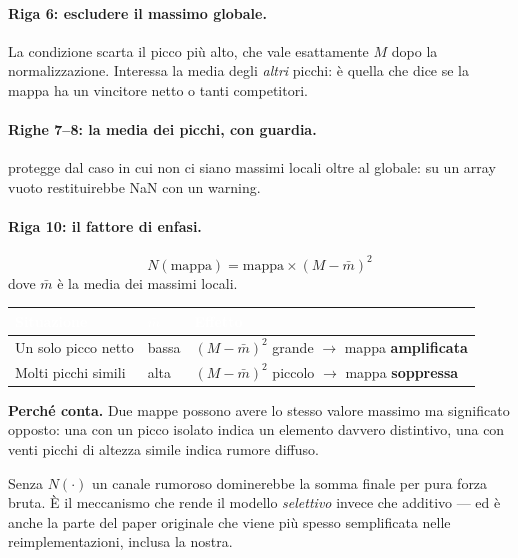 \paragraph{Riga 6: escludere il massimo globale.}
La condizione  scarta il picco più alto, che vale esattamente $M$
dopo la normalizzazione. Interessa la media degli \emph{altri} picchi: è quella che dice se la
mappa ha un vincitore netto o tanti competitori.

\paragraph{Righe 7--8: la media dei picchi, con guardia.}
 protegge dal caso in cui non ci siano massimi locali oltre al globale:
 su un array vuoto restituirebbe NaN con un warning.

\paragraph{Riga 10: il fattore di enfasi.}
\[
N(\text{mappa}) = \text{mappa} \times (M - \bar{m})^2
\]
dove $\bar{m}$ è la media dei massimi locali.

\begin{center}
\begin{tabular}{l l l}
\toprule
\rowcolor{tblHead}\textcolor{white}{\textbf{Situazione}} & \textcolor{white}{$\bar{m}$} & \textcolor{white}{\textbf{Effetto}} \\
\midrule
Un solo picco netto & bassa & $(M-\bar m)^2$ grande $\to$ mappa \textbf{amplificata} \\
\rowcolor{tblAlt} Molti picchi simili & alta & $(M-\bar m)^2$ piccolo $\to$ mappa \textbf{soppressa} \\
\bottomrule
\end{tabular}
\end{center}

\begin{nota}
\textbf{Perché conta.} Due mappe possono avere lo stesso valore massimo ma significato opposto:
una con un picco isolato indica un elemento davvero distintivo, una con venti picchi di altezza
simile indica rumore diffuso.

\medskip
Senza $N(\cdot)$ un canale rumoroso dominerebbe la somma finale per pura forza bruta. È il
meccanismo che rende il modello \emph{selettivo} invece che additivo --- ed è anche la parte del
paper originale che viene più spesso semplificata nelle reimplementazioni, inclusa la nostra.
\end{nota}

